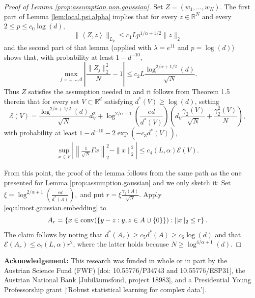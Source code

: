 \documentclass[11pt]{amsart}
\newcommand{\R}{\mathbb{R}}
\newcommand{\inr}[1]{\left\langle #1 \right\rangle}
\theoremstyle{definition}
\numberwithin{equation}{section}
\begin{document}
\begin{proof}[Proof of Lemma \ref{prop:assumption.non.gaussian}]
	Set $Z = (w_{1},\dots, w_{N})$.
	The first part of Lemma \ref{lem:local.psi.alpha} implies that for every $z\in \R^{N}$ and every  $2\leq p \leq c_{0} \log(d)$, 
\[\|\inr{Z,z}\|_{L_p}\leq c_{1} L p^{1/\alpha + 1/2}   \|z\|_{2}\]
	and the second part of that lemma (applied with $\lambda = e^{11}$ and $p=\log(d)$) shows that,  with probability at least $1-d^{-10}$,
\[ \max_{j=1,\dots,d }\left| \frac{ \|Z_{j}\|_{2}^{2} }{N} - 1 \right| 
	\leq  c_{2} L    \frac{\log^{2/\alpha + 1/2}(d)  }{\sqrt N} .\]
	Thus $Z$ satisfies the assumption needed in \cite{bartl2022random} and it follows from Theorem 1.5 therein that	for every set $V\subset \R^{d}$ satisfying $d^{\ast}(V)\geq \log(d)$, setting
	\[ \mathcal{E}(V) =   \frac {\log^{2/\alpha + 1/2}(d)  }{\sqrt N}  d_{V}^{2}+  \log^{2/\alpha+ 1} \left( \frac{ e d }{ d^{\ast}(V) }\right)  \left( d_{V} \frac{\gamma_{2}(V)}{\sqrt N } +  \frac{\gamma_{2}^{2}(V)}{ N } \right)  ,\]
	with probability at least $1- d^{-10} - 2\exp(-c_{3} d^{\ast}(V) )$,
	\begin{align}
	\label{eq:almost.gaussian.embedding}
	\sup_{x\in V} \left| \left\| \frac{1}{\sqrt N} \Gamma x \right\|_{2}^{2} - \|x\|_{2}^{2 } \right| 
	\leq  c_{4}(L,\alpha) \mathcal{E}(V).
	\end{align}

	From this point, the proof of the lemma follows from the same path as the one presented for Lemma \ref{prop:assumption.gaussian} and we only sketch it:
	Set $\xi = \log^{2/\alpha + 1} ( \frac{ed}{d^{\ast}(A) }),$
	and put $r =  \xi \frac{\gamma_{2}(A)}{\sqrt N}$.
	Apply \eqref{eq:almost.gaussian.embedding} to 
	\[ A_r=\left\{ x\in {\rm conv} (\{ y-z: y,z\in A\cup\{0\}\}) : \|x\|_{2}\leq r\right\}.\]
	The claim follows by 	noting that  $d^{\ast}(A_{r})\geq c_{5}d^{\ast}(A)\geq c_{6} \log(d)$ and that  $\mathcal{E}(A_{r}) \leq c_{7}(L,\alpha)r^{2}$, where the latter holds because  $N \geq \log^{4/\alpha+1}(d)$.
\end{proof}


\vspace{1em}

\noindent
{\bf Acknowledgement:} 
This research was funded in whole or in part by the Austrian Science Fund (FWF) [doi: 10.55776/P34743 and 10.55776/ESP31], the Austrian National Bank [Jubil\"aumsfond, project 18983], and a Presidential Young Professorship grant [`Robust statistical learning for complex data'].


%
%
\end{document}
